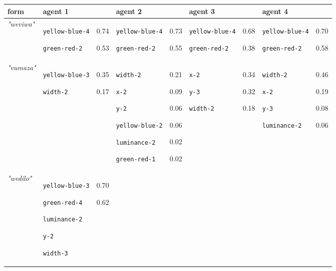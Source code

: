 
{\renewcommand{\arraystretch}{1.5}
\begin{tabular}{@{}p{0.95cm}|p{1.9cm}@{}p{0.6cm}@{}|p{1.9cm}@{}p{0.6cm}@{}|p{1.9cm}@{}p{0.6cm}@{}|p{1.9cm}@{}p{0.5cm}@{}}
form & agent 1 &  & agent 2 &  & agent 3 &  & agent 4 & \\
\hline
\textit{"weviwa"} & \texttt{yellow-blue-4}

\texttt{green-red-2} & 0.74

0.53 & \texttt{yellow-blue-4}

\texttt{green-red-2} & 0.73

0.55 & \texttt{yellow-blue-4}

\texttt{green-red-2} & 0.68

0.38 & \texttt{yellow-blue-4}

\texttt{green-red-2} & 0.70

0.58\\
\hline
\textit{"vumaza"} & \texttt{yellow-blue-3}

\texttt{width-2} & 0.35

0.17 & \texttt{width-2}

\texttt{x-2}

\texttt{y-2}

\texttt{yellow-blue-2}

\texttt{luminance-2}

\texttt{green-red-1} & 0.21

0.09

0.06

0.06

0.02

0.02 & \texttt{x-2}

\texttt{y-3}

\texttt{width-2} & 0.34

0.32

0.18 & \texttt{width-2}

\texttt{x-2}

\texttt{y-3}

\texttt{luminance-2} & 0.46

0.19

0.08

0.06\\
\hline
\textit{"wedilo"} & \texttt{yellow-blue-3}

\texttt{green-red-4}

\texttt{luminance-2}

\texttt{y-2}

\texttt{width-3} & 0.70

0.62


\end{tabular}}
